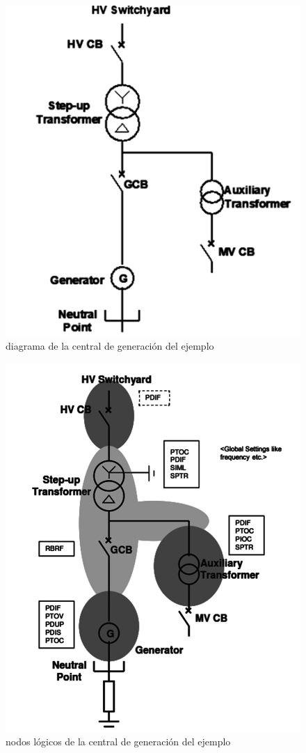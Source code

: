 \documentclass[a5paper]{book}%
\begin{document}
    \begin{figure}[H]
      \centering
      \caption{diagrama de la central de generación del ejemplo \thesubsection}
      \label{fig:centralgen}
      \includegraphics[width=0.7\linewidth]{generador}
    \end{figure}


    \begin{figure}[H]
      \centering
      \caption{nodos lógicos de la central de generación del ejemplo \thesubsection}
      \label{fig:nlcentral}
      \includegraphics[width=0.7\linewidth]{nl_generador}
    \end{figure}    
\end{document}
